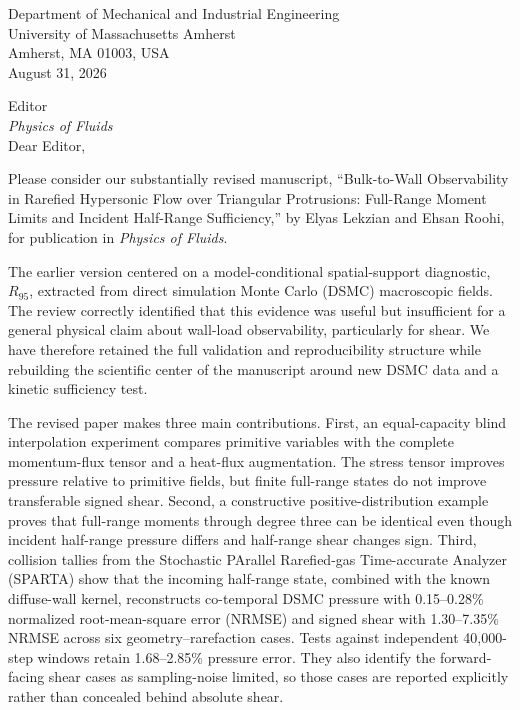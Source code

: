 \documentclass[10pt]{article}
\begin{document}
\begin{flushright}
Department of Mechanical and Industrial Engineering\\
University of Massachusetts Amherst\\
Amherst, MA 01003, USA\\[0.55em]
August 31, 2026
\end{flushright}

Editor\\
\emph{Physics of Fluids}\\[0.55em]

Dear Editor,

Please consider our substantially revised manuscript, ``Bulk-to-Wall Observability in Rarefied Hypersonic Flow over Triangular Protrusions: Full-Range Moment Limits and Incident Half-Range Sufficiency,'' by Elyas Lekzian and Ehsan Roohi, for publication in \emph{Physics of Fluids}.

The earlier version centered on a model-conditional spatial-support diagnostic, $R_{95}$, extracted from direct simulation Monte Carlo (DSMC) macroscopic fields. The review correctly identified that this evidence was useful but insufficient for a general physical claim about wall-load observability, particularly for shear. We have therefore retained the full validation and reproducibility structure while rebuilding the scientific center of the manuscript around new DSMC data and a kinetic sufficiency test.

The revised paper makes three main contributions. First, an equal-capacity blind interpolation experiment compares primitive variables with the complete momentum-flux tensor and a heat-flux augmentation. The stress tensor improves pressure relative to primitive fields, but finite full-range states do not improve transferable signed shear. Second, a constructive positive-distribution example proves that full-range moments through degree three can be identical even though incident half-range pressure differs and half-range shear changes sign. Third, collision tallies from the Stochastic PArallel Rarefied-gas Time-accurate Analyzer (SPARTA) show that the incoming half-range state, combined with the known diffuse-wall kernel, reconstructs co-temporal DSMC pressure with 0.15--0.28\% normalized root-mean-square error (NRMSE) and signed shear with 1.30--7.35\% NRMSE across six geometry--rarefaction cases. Tests against independent 40,000-step windows retain 1.68--2.85\% pressure error. They also identify the forward-facing shear cases as sampling-noise limited, so those cases are reported explicitly rather than concealed behind absolute shear.
\end{document}
